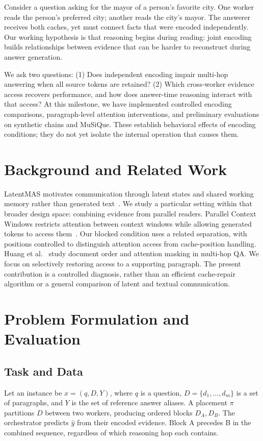 \documentclass[sigconf,nonacm]{acmart}
\begin{document}
Consider a question asking for the mayor of a person's favorite city. One
worker reads the person's preferred city; another reads the city's mayor.
The answerer receives both caches, yet must connect facts that were encoded
independently. Our working hypothesis is that reasoning begins during reading:
joint encoding builds relationships between evidence that can be harder to
reconstruct during answer generation.

We ask two questions: (1) Does independent encoding impair multi-hop answering
when all source tokens are retained? (2) Which cross-worker evidence access
recovers performance, and how does answer-time reasoning interact with that
access? At this milestone, we have implemented controlled encoding comparisons,
paragraph-level attention interventions, and preliminary evaluations on
synthetic chains and MuSiQue. These establish behavioral effects of encoding
conditions; they do not yet isolate the internal operation that causes them.

\section{Background and Related Work}
LatentMAS motivates communication through latent states and shared working
memory rather than generated text~\cite{latentmas2025}. We study a particular
setting within that broader design space: combining evidence from parallel
readers. Parallel Context Windows restricts attention between context windows
while allowing generated tokens to access them~\cite{pcw2023}. Our blocked
condition uses a related separation, with positions controlled to distinguish
attention access from cache-position handling. Huang et al.~\cite{masking2025}
study document order and attention masking in multi-hop QA. We focus on
selectively restoring access to a supporting paragraph. The present
contribution is a controlled diagnosis, rather than an efficient cache-repair
algorithm or a general comparison of latent and textual communication.

\section{Problem Formulation and Evaluation}
\subsection{Task and Data}
Let an instance be $x=(q,D,Y)$, where $q$ is a question,
$D=\{d_1,\ldots,d_m\}$ is a set of paragraphs, and $Y$ is the set of
reference answer aliases. A placement $\pi$ partitions $D$ between two
workers, producing ordered blocks $D_A,D_B$. The orchestrator predicts
$\hat y$ from their encoded evidence. Block A precedes B in the combined
sequence, regardless of which reasoning hop each contains.
\end{document}
